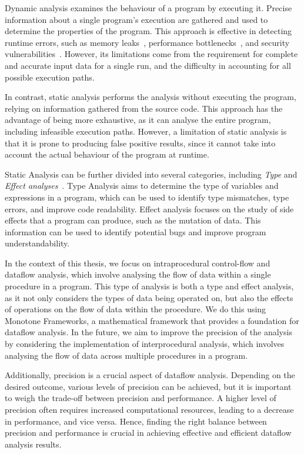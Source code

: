Dynamic analysis examines the behaviour of a program by executing it.
Precise information about a single program's execution are gathered
and used to determine the properties of the program.
This approach is effective in detecting runtime errors, such as memory leaks~\cite{Valgrind},
performance bottlenecks~\cite{VTune}, and security vulnerabilities~\cite{li2018fuzzing}.
However, its limitations come from the requirement for complete and
accurate input data for a single run, and the difficulty in accounting for
all possible execution paths.

In contrast, static analysis performs the analysis without executing the program,
relying on information gathered from the source code. This approach has
the advantage of being more exhaustive, as it can analyse the entire program,
including infeasible execution paths. However, a limitation of static analysis is
that it is prone to producing false positive results, since it cannot take into
account the actual behaviour of the program at runtime.

Static Analysis can be further divided into several categories, including \emph{Type}
and \emph{Effect analyses}~\cite{nielson1999type}. Type Analysis aims to determine the type of variables and expressions
in a program, which can be used to identify type mismatches, type errors, and improve
code readability. Effect analysis focuses on the study of side effects that a program can
produce, such as the mutation of data. This information can be used to identify
potential bugs and improve program understandability.

In the context of this thesis, we focus on intraprocedural control-flow and dataflow analysis, which
involve analysing the flow of data within a single procedure in a program.
This type of analysis is both a type and effect analysis, as it not only considers
the types of data being operated on, but also the effects of operations on the
flow of data within the procedure.
We do this using Monotone Frameworks, a mathematical framework that provides a
foundation for dataflow analysis. In the future, we aim to improve the precision of the analysis
by considering the implementation of interprocedural analysis, which involves
analysing the flow of data across multiple procedures in a program.

Additionally, precision is a crucial aspect of dataflow analysis.
Depending on the desired outcome, various levels of precision can be achieved,
but it is important to weigh the trade-off between precision and performance.
A higher level of precision often requires increased computational resources,
leading to a decrease in performance, and vice versa. Hence, finding the right
balance between precision and performance is crucial in achieving effective and
efficient dataflow analysis results.

